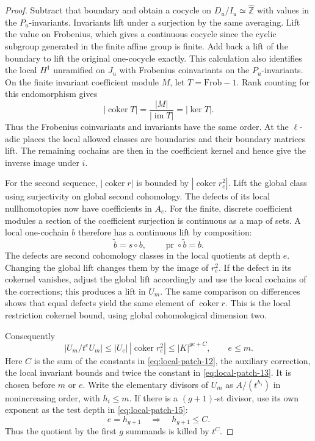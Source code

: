 \begin{proof}
Subtract that boundary and obtain a cocycle on
\(D_u/I_u\simeq\widehat{\mathbb Z}\) with values in the
\(P_u\)-invariants. Invariants lift under a surjection by the same
averaging. Lift the value on Frobenius, which gives a continuous
cocycle since the cyclic subgroup generated in the finite affine
group is finite. Add back a lift of the boundary to lift the original
one-cocycle exactly. This calculation also identifies the local
\(H^1\) unramified on \(J_u\) with Frobenius coinvariants on
the \(P_u\)-invariants. On the finite invariant coefficient module \(M\), let \(T=\mathrm{Frob}-1\).
Rank counting for this endomorphism gives
\[
 |\operatorname{coker}T|=\frac{|M|}{|\operatorname{im}T|}
                         =|\ker T|.
\]
Thus the Frobenius coinvariants and invariants have the same order. At the
\(\ell\)-adic places the local allowed classes
are boundaries and their boundary matrices
lift. The remaining cochains are then in the
coefficient kernel and hence give the inverse
image under \(i\).

For the second sequence,
\(|\operatorname{coker}r|\) is bounded by
\(|\operatorname{coker}r^2_e|\). Lift the global class
using surjectivity on global second cohomology.
The defects of its local nullhomotopies now have
coefficients in \(A_e\). For the finite, discrete coefficient modules a section of the coefficient surjection is continuous as a map of sets. A local one-cochain \(b\) therefore has a continuous lift by composition:
\[
 \tilde b=s\circ b,\qquad \operatorname{pr}\circ\tilde b=b .
\]
The defects are second cohomology classes in
the local quotients at depth \(e\). Changing the
global lift changes them by the image of
\(r^2_e\). If the defect in its cokernel vanishes,
adjust the global lift accordingly and use the
local cochains of the corrections; this produces
a lift in \(U_m\). The same comparison on
differences shows that equal defects yield the
same element of \(\operatorname{coker}r\).
This is the local restriction cokernel bound,
using global cohomological dimension two.

Consequently
\[
 |U_m/t^eU_m|\le |U_e|\,|\operatorname{coker} r^2_e|
                  \le |K|^{ge+C},\qquad e\le m.
 \tag{15}\label{eq:local-patch-15}
\]
Here \(C\) is the sum of the constants in \eqref{eq:local-patch-12},
the auxiliary correction, the local invariant
bounds and twice the constant in \eqref{eq:local-patch-13}. It is
chosen before \(m\) or \(e\). Write the elementary
divisors of \(U_m\) as \(A/(t^{h_i})\) in
nonincreasing order, with \(h_i\le m\).
If there is a \((g+1)\)-st divisor, use its own exponent as the test depth in \eqref{eq:local-patch-15}:
\[
 e=h_{g+1}\quad\Longrightarrow\quad h_{g+1}\le C .
\]
Thus the quotient by the first \(g\) summands is
killed by \(t^C\).


\end{proof}
